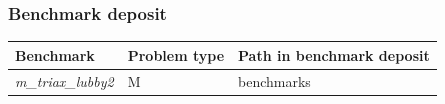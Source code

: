\subsubsection*{Benchmark deposit}

\begin{tabular}{|l|l|l|}
  \hline
  Benchmark & Problem type & Path in benchmark deposit \\
  \hline
 \emph{m\_triax\_lubby2} & M & benchmarks\verb \M\creep \\
  \hline
\end{tabular}
